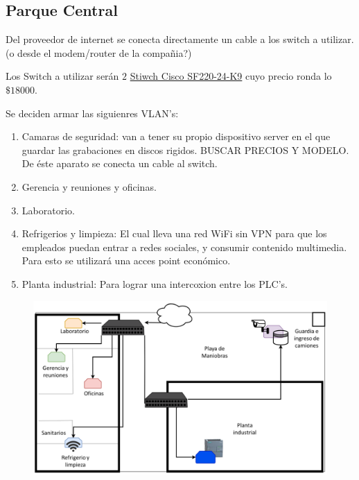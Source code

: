 \documentclass[11pt]{article}
\begin{document}
    \subsection*{Parque Central}

        Del proveedor de internet se conecta directamente un cable a los switch a utilizar. (o desde el modem/router de la compañia?)

        Los Switch a utilizar serán $2$ \href{https://articulo.mercadolibre.com.ar/MLA-714545399-switch-cisco-semi-admin-24-puertos-10100-2-giga-sf220-24-k9-_JM#position=34&type=item&tracking_id=4df4b6b4-1084-45cf-bab2-a07d312cf877}{Stiwch Cisco SF220-24-K9}
        cuyo precio ronda lo $\$18000$.


        Se deciden armar las siguienres VLAN's: 

        \begin{enumerate}
            \item Camaras de seguridad: van a tener su propio dispositivo server en el que guardar las grabaciones en discos rigidos. BUSCAR PRECIOS Y MODELO. De éste aparato se conecta un cable al switch.
            \item Gerencia y reuniones y oficinas.
            \item Laboratorio.
            \item Refrigerios y limpieza: El cual lleva una red WiFi sin VPN para que los empleados puedan entrar a redes sociales, y 
                consumir contenido multimedia. Para esto se utilizará una acces point económico.
            \item Planta industrial: Para lograr una intercoxion entre los PLC's.
        \end{enumerate}

        \begin{figure}[H]
            \centering
            \includegraphics[width=\textwidth]{Figure/Planta de parque.png}
        \end{figure}
        
\end{document}
